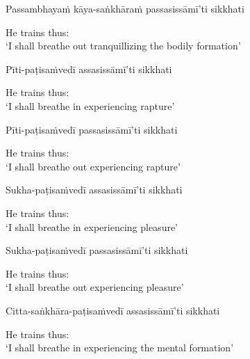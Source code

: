 Passambhayaṁ kāya-saṅkhāraṁ passasissāmī'ti sikkhati

\begin{english}
  He trains thus:\\
  `I shall breathe out tranquillizing the bodily formation'
\end{english}

Pīti-paṭisaṁvedī assasissāmī'ti sikkhati

\begin{english}
  He trains thus:\\
  `I shall breathe in experiencing rapture'
\end{english}

Pīti-paṭisaṁvedī passasissāmī'ti sikkhati

\begin{english}
  He trains thus:\\
  `I shall breathe out experiencing rapture'
\end{english}

Sukha-paṭisaṁvedī assasissāmī'ti sikkhati

\begin{english}
  He trains thus:\\
  `I shall breathe in experiencing pleasure'
\end{english}

Sukha-paṭisaṁvedī passasissāmī'ti sikkhati

\begin{english}
  He trains thus:\\
  `I shall breathe out experiencing pleasure'
\end{english}

Citta-saṅkhāra-paṭisaṁvedī assasissāmī'ti sikkhati

\begin{english}
  He trains thus:\\
  `I shall breathe in experiencing the mental formation'\makeatletter\hyperlink{endnote69-appendix}\makeatother
\end{english}

